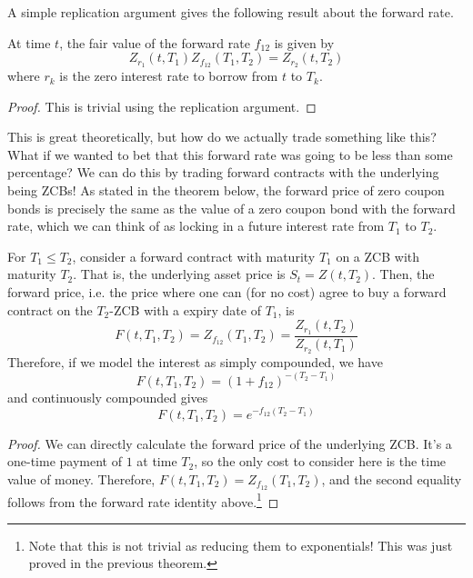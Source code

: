 \documentclass{article}
\begin{document}
    A simple replication argument gives the following result about the forward rate. 

    \begin{theorem}
      \label{thm:forward-rate}
      At time $t$, the fair value of the forward rate $f_{12}$ is given by 
      \begin{equation}
        Z_{r_1} (t, T_1) Z_{f_{12}} (T_1, T_2) = Z_{r_2} (t, T_2)
      \end{equation}
      where $r_k$ is the zero interest rate to borrow from $t$ to $T_k$. 
    \end{theorem}
    \begin{proof}
      This is trivial using the replication argument.
    \end{proof}

    This is great theoretically, but how do we actually trade something like this? What if we wanted to bet that this forward rate was going to be less than some percentage? We can do this by trading forward contracts with the underlying being ZCBs! As stated in the theorem below, the forward price of zero coupon bonds is precisely the same as the value of a zero coupon bond with the forward rate, which we can think of as locking in a future interest rate from $T_1$ to $T_2$.  

    \begin{theorem}
      \label{thm:forward-price-equals-value-of-zcb-at-forward}
      For $T_1 \leq T_2$, consider a forward contract with maturity $T_1$ on a ZCB with maturity $T_2$. That is, the underlying asset price is $S_t = Z(t, T_2)$. Then, the forward price, i.e. the price where one can (for no cost) agree to buy a forward contract on the $T_2$-ZCB with a expiry date of $T_1$, is 
      \begin{equation}
        F(t, T_1, T_2) = Z_{f_{12}} (T_1, T_2) = \frac{Z_{r_1} (t, T_2)}{Z_{r_2} (t, T_1)}
      \end{equation}
      Therefore, if we model the interest as simply compounded, we have 
      \begin{equation}
        F(t, T_1, T_2) = (1 + f_{12})^{-(T_2 - T_1)}
      \end{equation}
      and continuously compounded gives 
      \begin{equation}
        F(t, T_1, T_2) = e^{ -f_{12} (T_2 - T_1)}
      \end{equation}
    \end{theorem}
    \begin{proof}
      We can directly calculate the forward price of the underlying ZCB. It's a one-time payment of $1$ at time $T_2$, so the only cost to consider here is the time value of money. Therefore, $F(t, T_1, T_2) = Z_{f_{12}} (T_1, T_2)$, and the second equality follows from the forward rate identity above.\footnote{Note that this is not trivial as reducing them to exponentials! This was just proved in the previous theorem. } 
    \end{proof}
\end{document}
